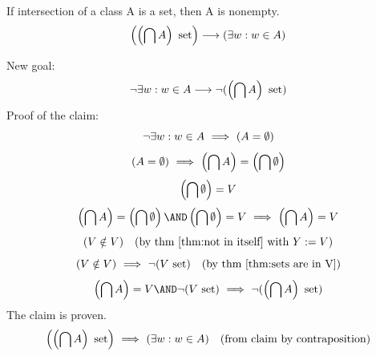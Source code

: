 \begin{theorem}
\label{thm:intersection set then}
If intersection of a class A is a set, then A is nonempty. 
\[
\left(\left(\bigcap A\right)\mathrm{\ set}\right)
\longrightarrow
(\exists w: w\in A)
\]
\end{theorem}
\Proof
New goal:
\[
\neg\exists w: w\in A
\longrightarrow
\neg(\left(\bigcap A\right)\mathrm{\ set})
\]
Proof of the claim:
\[
\neg\exists w: w\in A
\ \Longrightarrow\ 
(A=\emptyset)
\]
\[
(A=\emptyset)
\ \Longrightarrow\ 
\left(\bigcap A\right) = \left(\bigcap \emptyset\right)
\]
\[
\left(\bigcap \emptyset\right) = V
\]
\[
\left(\intersection A\right) = \left(\intersection \emptyset\right)
\AND
\left(\intersection \emptyset\right) = V
\IMPLIES
\left(\intersection A\right) = V
\]
\[
(V\notin V)
\quad\mbox{(by thm \ref{thm:not in itself} with $Y:=V$)}
\]
\[
(V\notin V)
\ \Longrightarrow\ 
\neg(V\mathrm{\ set})
\quad\mbox{(by thm \ref{thm:sets are in V})}
\]
\[
\left(\intersection A\right) = V
\AND
\neg(V\set)
\IMPLIES
\neg(\left(\intersection A\right) \set)
\]
The claim is proven.
\[
\left(\left(\bigcap A\right)\mathrm{\ set}\right)
\ \Longrightarrow\ 
(\exists w: w\in A)
\quad\mbox{(from claim by contraposition)}
\]
\Done


